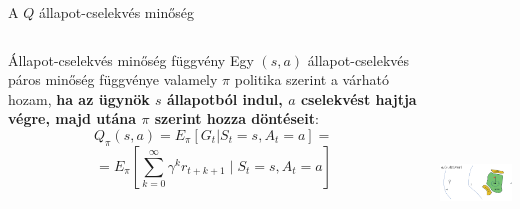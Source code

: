 \documentclass[english, aspectratio=169]{beamer}
\makeatletter
\let\origtableofcontents=\tableofcontents
\def\tableofcontents{\@ifnextchar[{\origtableofcontents}{\gobbletableofcontents}}
\def\gobbletableofcontents#1{\origtableofcontents}
\makeatother
\begin{document}
\begin{frame}
\tableofcontents[currentsection]
\end{frame}

\begin{frame}{A $Q$ állapot-cselekvés minőség}
\begin{columns}
\begin{column}{.5\textwidth}
\begin{block}{Állapot-cselekvés minőség függvény}
Egy $(s,a)$ állapot-cselekvés páros minőség függvénye valamely $\pi$ politika szerint a várható hozam, \textbf{ha az ügynök $s$ állapotból indul, $a$ cselekvést hajtja végre, majd utána $\pi$ szerint hozza döntéseit}:
\[
Q_{\pi}(s,a)=E_{\pi}\left[G_{t}|S_{t}=s,A_{t}=a\right]=
\]
\[
=E_{\pi}\left[\sum_{k=0}^{\infty}\gamma^{k}r_{t+k+1}\mid S_{t}=s,A_{t}=a\right]
\]
\end{block}
\end{column}
\begin{column}{.5\textwidth}
\begin{center}
\includegraphics[width=7cm, height=7cm, keepaspectratio]{images/reinforcement_14.png}
\end{center}
\end{column}
\end{columns}
\end{frame}
\end{document}
